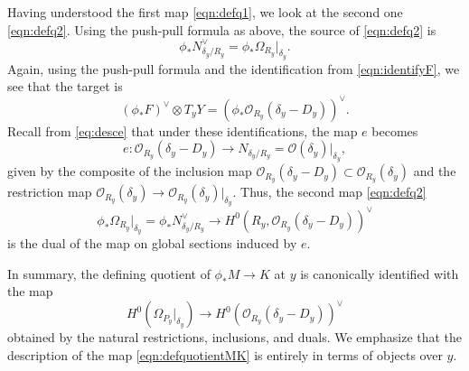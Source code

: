 \documentclass[11 pt]{amsart}
\renewcommand{\O}{{\mathcal O}}
\providecommand {\from}{{\colon}}
\numberwithin{equation}{section}
\begin{document}
Having understood the first map \eqref{eqn:defq1}, we look at the second one \eqref{eqn:defq2}.
Using the push-pull formula as above, the source of \eqref{eqn:defq2} is
\[\phi_* N_{\delta_y/R_y}^\vee = \phi_*\Omega_{R_y} \big|_{\delta_y}.\]
Again, using the push-pull formula and the identification from \eqref{eqn:identifyF}, we see that the target is
\[ (\phi_* F)^\vee \otimes T_y Y = \left(\phi_*\O_{R_y}(\delta_y-D_y)\right)^\vee.\]
Recall from \eqref{eq:desce} that under these identifications, the map $e$ becomes
\[ e \from \O_{R_y}(\delta_y - D_y) \to N_{\delta_y/R_y} = \O(\delta_y)|_{\delta_y},\]
given by the composite of the inclusion map $\O_{R_y}(\delta_y - D_y)  \subset \O_{R_y}(\delta_y)$ and the restriction map
$\O_{R_y}(\delta_y) \to \O_{R_y}(\delta_y) |_{\delta_y}$.
Thus, the second map \eqref{eqn:defq2}
\[ \phi_* \Omega_{R_y}|_{\delta_y} = \phi_* N_{\delta_y/R_y}^\vee \to H^0(R_y, \O_{R_y}(\delta_y-D_y))^\vee\]
is the dual of the map on global sections induced by $e$.

In summary, the defining quotient of $\phi_*M \to K$ at $y$ is canonically identified with the map
\begin{equation}\label{eqn:defquotientMK}
  H^0\left(\Omega_{P_y}|_{\delta_y}\right) \to H^0\left(\O_{R_y}(\delta_y - D_y)\right)^\vee
\end{equation}
obtained by the natural restrictions, inclusions, and duals.
We emphasize that the description of the map \eqref{eqn:defquotientMK} is entirely in terms of objects over $y$.
\end{document}
